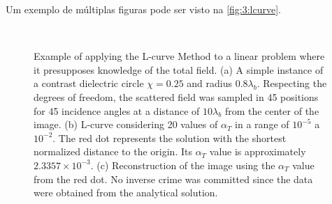 		Um exemplo de múltiplas figuras pode ser visto na \autoref{fig:3:lcurve}.
		\begin{figure}[!htb]
			\centering
			 \\
			\caption[Exemplo de aplicação do Método da Curva-L.]{Example of applying the L-curve Method to a linear problem where it presupposes knowledge of the total field. (a) A simple instance of a contrast dielectric circle $\chi=0.25$ and radius $0.8\lambda_b$. Respecting the degrees of freedom, the scattered field was sampled in 45 positions for 45 incidence angles at a distance of $10\lambda_b$ from the center of the image. (b) L-curve considering 20 values of $\alpha_T$ in a range of $10^{-5}$ a $10^{-2}$. The red dot represents the solution with the shortest normalized distance to the origin. Its $\alpha_T$ value is approximately $2.3357 \times10^{-3}$. (c) Reconstruction of the image using the $\alpha_T$ value from the red dot. No inverse crime was committed since the data were obtained from the analytical solution.}
			\label{fig:3:lcurve}
		\end{figure}
	
